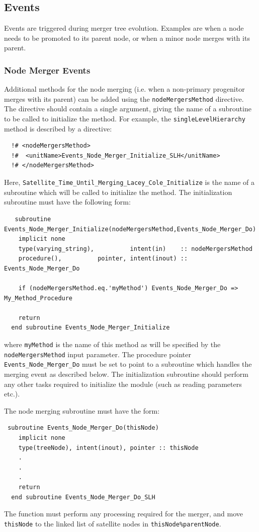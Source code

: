 \subsection{Events}

Events are triggered during merger tree evolution. Examples are when a node needs to be promoted to its parent node, or when a minor node merges with its parent.

\subsubsection{Node Merger Events}

Additional methods for the node merging (i.e. when a non-primary progenitor merges with its parent) can be added using the {\tt nodeMergersMethod} directive. The directive should contain a single argument, giving the name of a subroutine to be called to initialize the method. For example, the {\tt singleLevelHierarchy} method is described by a directive:
\begin{verbatim}
  !# <nodeMergersMethod>
  !#  <unitName>Events_Node_Merger_Initialize_SLH</unitName>
  !# </nodeMergersMethod>
\end{verbatim}
Here, {\tt Satellite\_Time\_Until\_Merging\_Lacey\_Cole\_Initialize} is the name of a subroutine which will be called to initialize the method. The initialization subroutine must have the following form:
\begin{verbatim}
   subroutine Events_Node_Merger_Initialize(nodeMergersMethod,Events_Node_Merger_Do)
    implicit none
    type(varying_string),          intent(in)    :: nodeMergersMethod
    procedure(),          pointer, intent(inout) :: Events_Node_Merger_Do

    if (nodeMergersMethod.eq.'myMethod') Events_Node_Merger_Do => My_Method_Procedure

    return
  end subroutine Events_Node_Merger_Initialize
\end{verbatim}
where {\tt myMethod} is the name of this method as will be specified by the {\tt nodeMergersMethod} input parameter. The procedure pointer {\tt Events\_Node\_Merger\_Do} must be set to point to a subroutine which handles the merging event as described below. The initialization subroutine should perform any other tasks required to initialize the module (such as reading parameters etc.).

The node merging subroutine must have the form:
\begin{verbatim}
 subroutine Events_Node_Merger_Do(thisNode)
    implicit none
    type(treeNode), intent(inout), pointer :: thisNode
    .
    .
    .
    return
  end subroutine Events_Node_Merger_Do_SLH
\end{verbatim}
The function must perform any processing required for the merger, and move {\tt thisNode} to the linked list of satellite nodes in {\tt thisNode\%parentNode}.

